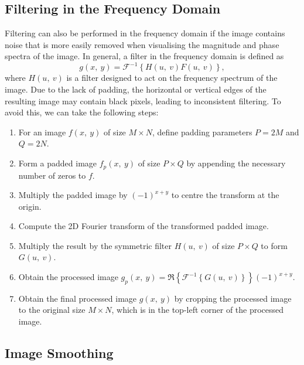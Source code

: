\documentclass{article}
\begin{document}
\subsection{Filtering in the Frequency Domain}
Filtering can also be performed in the frequency domain if the image
contains noise that is more easily removed when visualising the
magnitude and phase spectra of the image. In general, a filter in the
frequency domain is defined as
\begin{equation*}
    g\left( x,\: y \right) = \mathscr{F}^{-1}\left\{ H\left( u,\: v \right) F\left( u,\: v \right) \right\},
\end{equation*}
where \(H\left( u,\: v \right)\) is a filter designed to act on the
frequency spectrum of the image. Due to the lack of padding, the
horizontal or vertical edges of the resulting image may contain black
pixels, leading to inconsistent filtering. To avoid this, we can take
the following steps:
\begin{enumerate}
    \item For an image \(f\left( x,\: y \right)\) of size \(M \times
          N\), define padding parameters \(P = 2M\) and \(Q = 2N\).
    \item Form a padded image \(f_p\left( x,\: y \right)\) of size \(P
          \times Q\) by appending the necessary number of zeros to
          \(f\).\
    \item Multiply the padded image by \(\left( -1 \right)^{x + y}\) to
          centre the transform at the origin.
    \item Compute the 2D Fourier transform of the transformed padded
          image.
    \item Multiply the result by the symmetric filter \(H\left( u,\: v
          \right)\) of size \(P \times Q\) to form \(G\left( u,\: v
          \right)\).
    \item Obtain the processed image \(g_p\left( x,\: y \right) =
          \Re\left\{ \mathscr{F}^{-1}\left\{ G\left( u,\: v \right)
          \right\} \right\} \left( -1 \right)^{x + y}\).
    \item Obtain the final processed image \(g\left( x,\: y \right)\)
          by cropping the processed image to the original size \(M
          \times N\), which is in the top-left corner of the processed
          image.
\end{enumerate}
\subsection{Image Smoothing}
\end{document}
